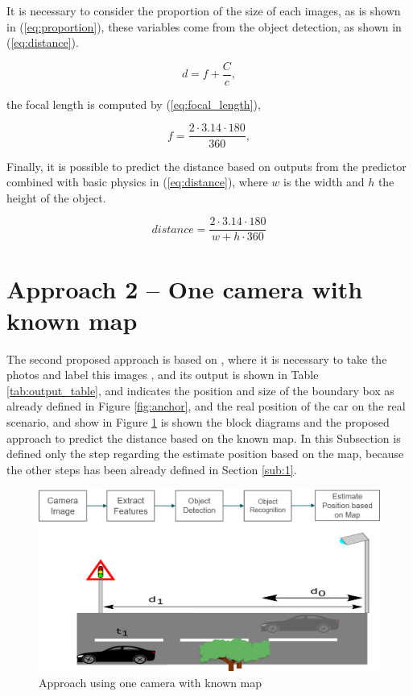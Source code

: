 It is necessary to consider the proportion of the size of each images, as is shown in (\ref{eq:proportion}), these variables come from the object detection, as shown in (\ref{eq:distance}).


\begin{equation}
    \label{eq:proportion}
    d = f + \frac{C}{c},
\end{equation}

the focal length is computed by (\ref{eq:focal_length}), 

\begin{equation}
    \label{eq:focal_length}
    f = \frac{2\cdot 3.14 \cdot 180}{360},
\end{equation}

Finally, it is possible to predict the distance based on outputs from the predictor combined with basic physics in (\ref{eq:distance}), where $w$ is the width and $h$ the height of the object.

\begin{equation}
    \label{eq:distance}
    distance = \frac{2 \cdot 3.14 \cdot  180}{w + h \cdot  360}
\end{equation}



 
\section{Approach 2 – One camera with known map}\label{sub:2}

The second proposed approach is based on  \cite{mayer2016large}, where it is necessary to take the photos and label this images \cite{tzutalin6labelimg}, and its output is shown in Table \ref{tab:output_table}, and indicates the position and size of the boundary box as already defined in Figure \ref{fig:anchor}, and the real position of the car on the real scenario, and show in Figure \ref{fig:proposal2} is shown the block diagrams and the proposed approach to predict the distance based on the known map. In this Subsection is defined only the step regarding the estimate position based on the map, because the other steps has been already defined in Section \ref{sub:1}. 


\begin{figure}[H]
\centering
\includegraphics[width=\textwidth]{imagens/proposal2.png}
\caption{Approach using one camera with known map}
\label{fig:proposal2}
\end{figure}


